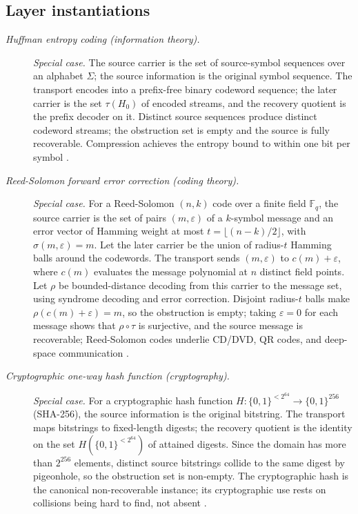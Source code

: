 \subsection*{Layer instantiations}\label{layer-inst:F34}

\begingroup\small
\begin{description}
\item[\emph{Huffman entropy coding (information theory).}] \textit{Special case.}
The source carrier is the set of source-symbol sequences
over an alphabet \(\Sigma\); the source information is
the original symbol sequence.  The transport encodes
into a prefix-free binary codeword sequence; the later carrier is the set \(\tau(H_0)\) of encoded streams, and the recovery quotient is the prefix decoder on it.  Distinct
source sequences produce distinct codeword streams; the
obstruction set is empty and the source is fully
recoverable.  Compression achieves the entropy bound to
within one bit per symbol
\citep{Huffman1952Method}.

\item[\emph{Reed-Solomon forward error correction
(coding theory).}] \textit{Special case.}
For a Reed-Solomon \((n,k)\) code over a finite field
\(\mathbb F_q\), the source carrier is the set of pairs
\((m,\varepsilon)\) of a \(k\)-symbol message and an error
vector of Hamming weight at most
\(t=\lfloor(n-k)/2\rfloor\), with \(\sigma(m,\varepsilon)=m\).
Let the later carrier be the union of radius-\(t\) Hamming
balls around the codewords. The transport sends
\((m,\varepsilon)\) to \(c(m)+\varepsilon\), where \(c(m)\)
evaluates the message polynomial at \(n\) distinct field
points. Let \(\rho\) be bounded-distance decoding from this
carrier to the message set, using syndrome decoding and error
correction. Disjoint radius-\(t\) balls make
\(\rho(c(m)+\varepsilon)=m\), so the obstruction is empty;
taking \(\varepsilon=0\) for each message shows that
\(\rho\circ\tau\) is surjective, and the source message is
recoverable; Reed-Solomon codes underlie CD/DVD, QR
codes, and deep-space communication
\citep{ReedSolomon1960Codes}.

\item[\emph{Cryptographic one-way hash function
(cryptography).}] \textit{Special case.}
For a cryptographic hash function
\(H:\{0,1\}^{<2^{64}}\to\{0,1\}^{256}\) (SHA-256), the
source information is the original bitstring.  The
transport maps bitstrings to fixed-length digests;
the recovery quotient is the identity on the set \(H(\{0,1\}^{<2^{64}})\) of attained digests.
Since the domain has more than \(2^{256}\) elements, distinct source
bitstrings collide to the same digest by pigeonhole, so the obstruction set is non-empty.  The
cryptographic hash is the canonical non-recoverable
instance; its cryptographic use rests on collisions
being hard to find, not absent
\citep{NIST2015FIPS180}.


\end{description}
